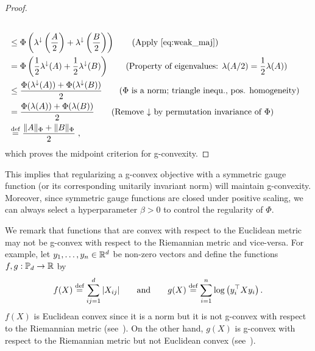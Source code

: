 \documentclass[sn-nature]{sn-jnl}%
\theoremstyle{thmstyleone}%
\theoremstyle{thmstyletwo}%
\theoremstyle{thmstylethree}%
\begin{document}
\begin{proof}
\begin{align*}
\begin{split}
            \\& \leq \Phi\left(\lambda^\downarrow\left(\frac{A}{2}\right) + \lambda^\downarrow\left(\frac{B}{2}\right) \right) \qquad \text{(Apply \eqref{eq:weak_maj})}
            \\&= \Phi\left(\frac{1}{2}\lambda^\downarrow(A) + \frac{1}{2}\lambda^\downarrow(B)\right) \qquad (\text{Property of eigenvalues: }\lambda(A/2) = \frac{1}{2}\lambda(A))
            \\&\leq \frac{\Phi(\lambda^\downarrow(A)) + \Phi(\lambda^\downarrow(B))}{2} \qquad (\Phi \text{ is a norm; triangle inequ., pos. homogeneity})
    \\&=\frac{\Phi(\lambda(A)) + \Phi(\lambda(B))}{2} \qquad \text{(Remove $\downarrow$ by permutation invariance of $\Phi$)}
    \\&\stackrel{\text{def}}{=} \frac{\|A\|_\Phi + \|B\|_\Phi}{2} \; ,
        \end{split} 
    \end{align*}
    which proves the midpoint criterion for g-convexity.
\end{proof}
This implies that regularizing a g-convex objective with a symmetric gauge function (or its corresponding unitarily invariant norm) will maintain g-convexity. Moreover, since symmetric gauge functions are closed under positive scaling, we can always select a hyperparameter $\beta > 0$ to control the regularity of $\Phi$. 

\begin{remark}
    We remark that functions that are convex with respect to the Euclidean metric may not be g-convex with respect to the Riemannian metric and vice-versa. For example, let $y_1, \ldots, y_n \in \mathbb{R}^d$ be non-zero vectors and define the functions $f,g:\mathbb{P}_d \to \mathbb{R}$ by
    \[
    f(X) \stackrel{\text{def}}{=} \sum_{ij=1}^d |X_{ij}| \qquad \text{and} \qquad g(X) \stackrel{\text{def}}{=} \sum_{i=1}^n \log \left(y_i^\top X y_i\right).
    \]
    $f(X)$ is Euclidean convex since it is a norm but it is not g-convex with respect to the Riemannian metric (see~\cite[Proposition 11]{cheng2024disciplinedgeodesicallyconvexprogramming}). On the other hand, $g(X)$ is g-convex with respect to the Riemannian metric but not Euclidean convex (see~\cite[Proposition 12]{cheng2024disciplinedgeodesicallyconvexprogramming}).
\end{remark}
\end{document}
